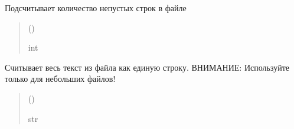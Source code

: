 \documentclass[a4paper,11pt,russian,openany,oneside]{sphinxmanual}
\begin{document}

\begin{savenotes}\begin{fulllineitems}
\label{\detokenize{scan_module:scan_module.read_files.count_lines_in_file}}
\pysigstartsignatures
\pysiglinewithargsret
{}
{}
{}
\pysigstopsignatures
\sphinxAtStartPar
Подсчитывает количество непустых строк в файле
\begin{quote}\begin{description}
\sphinxAtStartPar
{} ()

\sphinxAtStartPar
int

\end{description}\end{quote}

\end{fulllineitems}\end{savenotes}


\begin{savenotes}\begin{fulllineitems}
\label{\detokenize{scan_module:scan_module.read_files.get_text_from_file}}
\pysigstartsignatures
\pysiglinewithargsret
{}
{}
{}
\pysigstopsignatures
\sphinxAtStartPar
Считывает весь текст из файла как единую строку.
ВНИМАНИЕ: Используйте только для небольших файлов!
\begin{quote}\begin{description}
\sphinxAtStartPar
{} ()

\sphinxAtStartPar
str

\end{description}\end{quote}

\end{fulllineitems}\end{savenotes}
\end{document}
